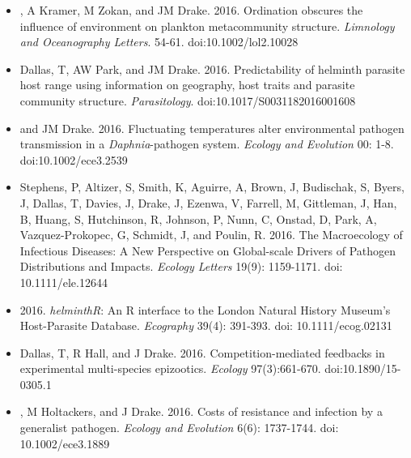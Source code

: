 \documentclass[]{CV}
\begin{document}
{}
\begin{itemize}

\item {}, A Kramer, M Zokan, and JM Drake. 2016. Ordination obscures the influence of environment on plankton metacommunity structure. \textit{Limnology and Oceanography Letters}. 54-61. doi:10.1002/lol2.10028

\item {\mefont Dallas, T}, AW Park, and JM Drake. 2016. Predictability of helminth parasite host range using information on geography, host traits and parasite community structure. \textit{Parasitology}. doi:10.1017/S0031182016001608

\item {} and JM Drake. 2016. Fluctuating temperatures alter environmental pathogen transmission in a \textit{Daphnia}-pathogen system. \textit{Ecology and Evolution} 00: 1-8. doi:10.1002/ece3.2539

\item \OA Stephens, P, Altizer, S, Smith, K, Aguirre, A, Brown, J, Budischak, S, Byers, J, {\mefont Dallas, T}, Davies, J, Drake, J, Ezenwa, V, Farrell, M, Gittleman, J, Han, B, Huang, S, Hutchinson, R, Johnson, P, Nunn, C, Onstad, D, Park, A, Vazquez-Prokopec, G, Schmidt, J, and Poulin, R. 2016. The Macroecology of Infectious Diseases: A New Perspective on Global-scale Drivers of Pathogen Distributions and Impacts. \textit{Ecology Letters} 19(9): 1159-1171. doi: 10.1111/ele.12644

\item {} 2016. \textit{helminthR}: An R interface to the London Natural History Museum's Host-Parasite Database. \textit{Ecography} 39(4): 391-393. doi: 10.1111/ecog.02131 \href{https://github.com/ropensci/helminthR}{ \OD}

\item {\mefont Dallas, T}, R Hall, and J Drake. 2016. Competition-mediated feedbacks in experimental multi-species epizootics. \textit{Ecology} 97(3):661-670. doi:10.1890/15-0305.1 \href{https://figshare.com/articles/R_code_to_reproduce_the_analyses_from_Dallas_Hall_and_Drake_2015_Competition-mediated_feedbacks_in_experimental_multi-species_epizootics_Ecology/3159349}{ \OD}

\item {}, M Holtackers, and J Drake. 2016. Costs of resistance and infection by a generalist pathogen. \textit{Ecology and Evolution} 6(6): 1737-1744. doi: 10.1002/ece3.1889 \href{}{ \OD}

\end{itemize}
\end{document}
